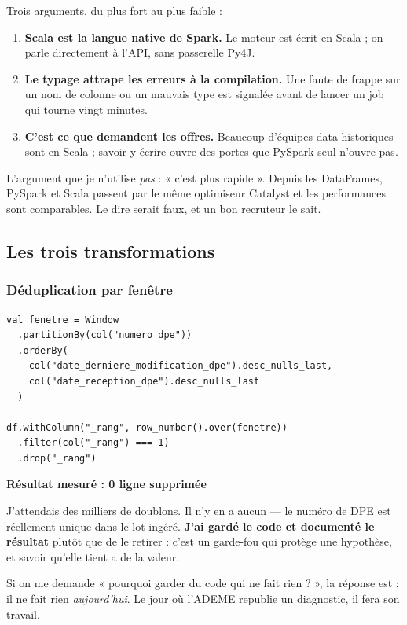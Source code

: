 \documentclass[11pt,a4paper]{article}
\newcommand{\titrebloc}[1]{\textbf{\color{encre}#1}\par\vspace{0.25em}}
\begin{document}
\begin{pourquoi}
Trois arguments, du plus fort au plus faible :

\begin{enumerate}
  \item \textbf{Scala est la langue native de Spark.} Le moteur est écrit en
        Scala ; on parle directement à l'API, sans passerelle Py4J.
  \item \textbf{Le typage attrape les erreurs à la compilation.} Une faute de
        frappe sur un nom de colonne ou un mauvais type est signalée avant de
        lancer un job qui tourne vingt minutes.
  \item \textbf{C'est ce que demandent les offres.} Beaucoup d'équipes data
        historiques sont en Scala ; savoir y écrire ouvre des portes que
        PySpark seul n'ouvre pas.
\end{enumerate}

L'argument que je n'utilise \emph{pas} : « c'est plus rapide ». Depuis les
DataFrames, PySpark et Scala passent par le même optimiseur Catalyst et les
performances sont comparables. Le dire serait faux, et un bon recruteur le
sait.
\end{pourquoi}

\subsection{Les trois transformations}

\subsubsection{Déduplication par fenêtre}

\begin{lstlisting}[style=sc]
val fenetre = Window
  .partitionBy(col("numero_dpe"))
  .orderBy(
    col("date_derniere_modification_dpe").desc_nulls_last,
    col("date_reception_dpe").desc_nulls_last
  )

df.withColumn("_rang", row_number().over(fenetre))
  .filter(col("_rang") === 1)
  .drop("_rang")
\end{lstlisting}

\begin{attention}
\titrebloc{Résultat mesuré : 0 ligne supprimée}
J'attendais des milliers de doublons. Il n'y en a aucun — le numéro de DPE est
réellement unique dans le lot ingéré. \textbf{J'ai gardé le code et documenté
le résultat} plutôt que de le retirer : c'est un garde-fou qui protège une
hypothèse, et savoir qu'elle tient a de la valeur.

Si on me demande « pourquoi garder du code qui ne fait rien ? », la réponse
est : il ne fait rien \emph{aujourd'hui}. Le jour où l'ADEME republie un
diagnostic, il fera son travail.
\end{attention}
\end{document}
